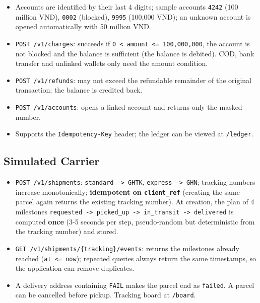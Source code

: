 \begin{itemize}
\tightlist
\item
  Accounts are identified by their last 4 digits; sample accounts
  \texttt{4242} (100 million VND), \texttt{0002} (blocked),
  \texttt{9995} (100,000 VND); an unknown account is opened
  automatically with 50 million VND.
\item
  \texttt{POST /\allowbreak{}v1/\allowbreak{}charges}: succeeds if
  \texttt{0 \textless{} amount \textless{}=\allowbreak{} 100,\allowbreak{}000,\allowbreak{}000}, the
  account is not blocked and the balance is sufficient (the balance is
  debited). COD, bank transfer and unlinked wallets only need the amount
  condition.
\item
  \texttt{POST /\allowbreak{}v1/\allowbreak{}refunds}: may not exceed the refundable remainder of
  the original transaction; the balance is credited back.
\item
  \texttt{POST /\allowbreak{}v1/\allowbreak{}accounts}: opens a linked account and returns only
  the masked number.
\item
  Supports the \texttt{Idempotency-Key} header; the ledger can be viewed
  at \texttt{/\allowbreak{}ledger}.
\end{itemize}

\hypertarget{simulated-carrier}{%
\subsection{Simulated Carrier}\label{simulated-carrier}}

\begin{itemize}
\tightlist
\item
  \texttt{POST /\allowbreak{}v1/\allowbreak{}shipments}:
  \texttt{standard -\textgreater{}\allowbreak{} GHTK},
  \texttt{express -\textgreater{}\allowbreak{} GHN}; tracking numbers increase
  monotonically; \textbf{idempotent on \texttt{client\_\allowbreak{}ref}} (creating
  the same parcel again returns the existing tracking number). At
  creation, the plan of 4 milestones
  \texttt{requested -\textgreater{}\allowbreak{} picked\_\allowbreak{}up -\textgreater{}\allowbreak{} in\_\allowbreak{}transit -\textgreater{}\allowbreak{} delivered}
  is computed \textbf{once} (3-5 seconds per step, pseudo-random but
  deterministic from the tracking number) and stored.
\item
  \texttt{GET /\allowbreak{}v1/\allowbreak{}shipments/\allowbreak{}\{tracking\}/\allowbreak{}events}: returns the
  milestones already reached (\texttt{at \textless{}=\allowbreak{} now}); repeated
  queries always return the same timestamps, so the application can
  remove duplicates.
\item
  A delivery address containing \texttt{FAIL} makes the parcel end as
  \texttt{failed}. A parcel can be cancelled before pickup. Tracking
  board at \texttt{/\allowbreak{}board}.
\end{itemize}

